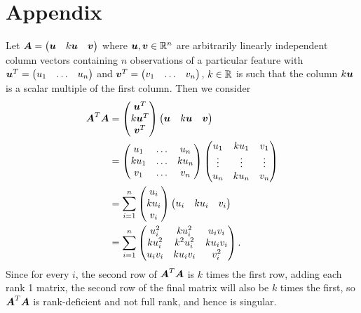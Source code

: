 \documentclass[12pt]{article}
\begin{document}
	\section{Appendix}
	Let $\boldsymbol{A}=\begin{pmatrix}
		\boldsymbol{u} & k\boldsymbol{u} & \boldsymbol{v}
	\end{pmatrix}$ where $\bmu,\bmv\in\Rn$ are arbitrarily linearly independent column vectors containing $n$ observations of a particular feature with $\boldsymbol{u}^T=\begin{pmatrix}
		u_1 & \ldots & u_n
	\end{pmatrix}$ and $\boldsymbol{v}^T=\begin{pmatrix}
		v_1 & \ldots & v_n
	\end{pmatrix}$, $k\in\RR$ is such that the column $k\boldsymbol{u}$ is a scalar multiple of the first column. Then we consider
	\begin{align*}
		\boldsymbol{A}^T\boldsymbol{A}&=\begin{pmatrix}
			\boldsymbol{u}^T \\ k\boldsymbol{u}^T \\ \boldsymbol{v}^T
		\end{pmatrix}\begin{pmatrix}
			\boldsymbol{u} & k\boldsymbol{u} & \boldsymbol{v}
		\end{pmatrix}\\
		&=\begin{pmatrix}
			u_1 & \ldots & u_n \\ ku_1 & \ldots & ku_n \\ v_1 & \ldots & v_n
		\end{pmatrix}\begin{pmatrix}
			u_1 & ku_1 & v_1 \\ \vdots & \vdots & \vdots \\ u_n & ku_n & v_n
		\end{pmatrix}\\
		&=\sum_{i=1}^{n}\begin{pmatrix}
			u_i \\ ku_i \\ v_i
		\end{pmatrix}\begin{pmatrix}
			u_i & ku_i & v_i
		\end{pmatrix}\\
		&=\sum_{i=1}^{n}\begin{pmatrix}
			u_i^2 & ku_i^2 & u_iv_i \\ 
			ku_i^2 & k^2u_i^2 & ku_iv_i \\
			u_iv_i & ku_iv_i & v_i^2
		\end{pmatrix}.
	\end{align*}
	Since for every $i$, the second row of $\boldsymbol{A}^T\boldsymbol{A}$ is $k$ times the first row, adding each rank 1 matrix, the second row of the final matrix will also be $k$ times the first, so $\boldsymbol{A}^T\boldsymbol{A}$ is rank-deficient and not full rank, and hence is singular. \\
	
\end{document}
